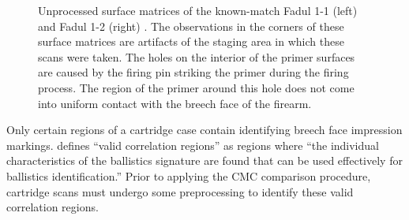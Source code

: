 \begin{Schunk}
\begin{figure}[htbp]

{\centering {}

}

\caption{\label{fig:cartridgeCasePair} Unprocessed surface matrices of the known-match Fadul 1-1 (left) and Fadul 1-2 (right) \citep{fadul_empirical_2011}. The observations in the corners of these surface matrices are artifacts of the staging area in which these scans were taken. The holes on the interior of the primer surfaces are caused by the firing pin striking the primer during the firing process. The region of the primer around this hole does not come into uniform contact with the breech face of the firearm.}\label{fig:rawBFs}
\end{figure}
\end{Schunk}

Only certain regions of a cartridge case contain identifying breech face
impression markings. \citet{song_proposed_2013} defines ``valid
correlation regions'' as regions where ``the individual characteristics
of the ballistics signature are found that can be used effectively for
ballistics identification.'' Prior to applying the CMC comparison
procedure, cartridge scans must undergo some preprocessing to identify
these valid correlation regions.

